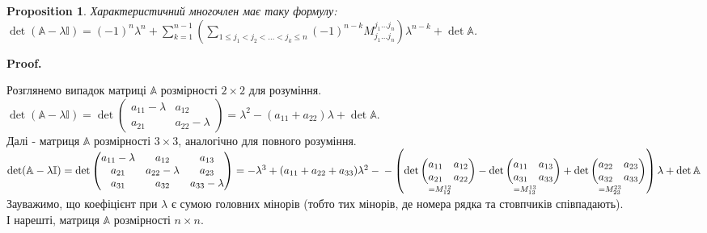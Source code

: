 \documentclass[a4paper, 10pt]{article}
\makeatletter
\theoremstyle{theoremdd}
\newtheorem{proposition}[theorem]{Proposition}
\renewenvironment{proof}[1][Proof.\\]{\par
\pushQED{\hfill \qed}%
\normalfont \topsep6\p@\@plus6\p@\relax
\trivlist
\item\relax
{\bfseries
#1\@addpunct{.}}\hspace\labelsep\ignorespaces
}{%
\popQED\endtrivlist\@endpefalse
}
\makeatother
\begin{document}
\begin{proposition}
Характеристичний многочлен має таку формулу: \\ $\det(\mathbb{A} - \lambda \mathbb{I}) = \displaystyle (-1)^n \lambda^n + \sum_{k=1}^{n-1} \left( \sum_{1 \leq j_1 < j_2 < \dots < j_k \leq n} (-1)^{n-k} M_{j_1 \dots j_n}^{j_1 \dots j_n} \right) \lambda^{n-k} + \det \mathbb{A}$.
\end{proposition}

\begin{proof}
Розглянемо випадок матриці $\mathbb{A}$ розмірності $2 \times 2$ для розуміння.\\
$\det (\mathbb{A} - \lambda \mathbb{I}) = \det \begin{pmatrix}
a_{11}-\lambda & a_{12} \\
a_{21} & a_{22} - \lambda
\end{pmatrix} = \lambda^2 - (a_{11}+a_{22})\lambda + \det \mathbb{A}$.
\bigskip \\
Далі - матриця $\mathbb{A}$ розмірності $3 \times 3$, аналогічно для повного розуміння.\\
$\det (\mathbb{A} - \lambda \mathbb{I}) = \det \begin{pmatrix}
a_{11}-\lambda & a_{12} & a_{13} \\
a_{21} & a_{22}-\lambda & a_{23} \\
a_{31} & a_{32} & a_{33}-\lambda \\
\end{pmatrix} = -\lambda^3 + (a_{11}+a_{22}+a_{33})\lambda^2 - \\ - \left(\underset{=M_{12}^{12}}{\det \begin{pmatrix}
a_{11} & a_{12} \\
a_{21} & a_{22}
\end{pmatrix}} - \underset{=M_{13}^{13}}{\det \begin{pmatrix}
a_{11} & a_{13} \\
a_{31} & a_{33}
\end{pmatrix}} + \underset{=M_{23}^{23}}{\det \begin{pmatrix}
a_{22} & a_{23} \\
a_{32} & a_{33}
\end{pmatrix}} \right)\lambda + \det \mathbb{A}$\\
Зауважимо, що коефіцієнт при $\lambda$ є сумою головних мінорів (тобто тих мінорів, де номера рядка та стовпчиків співпадають).
\bigskip \\
І нарешті, матриця $\mathbb{A}$ розмірності $n \times n$.\\

\end{proof}
\end{document}
